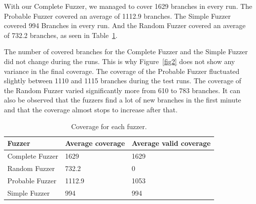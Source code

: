 \documentclass[runningheads]{llncs}
\begin{document}
With our Complete Fuzzer, we managed to cover 1629 branches in every run. The Probable Fuzzer covered an average of 1112.9 branches. The Simple Fuzzer covered 994 Branches in every run. And the Random Fuzzer covered an average of 732.2 branches, as seen in Table~\ref{tab3}.

The number of covered branches for the Complete Fuzzer and the Simple Fuzzer did not change during the runs. This is why Figure~\ref{fig2} does not show any variance in the final coverage. The coverage of the Probable Fuzzer fluctuated slightly between 1110 and 1115 branches during the test runs. The coverage of the Random Fuzzer varied significantly more from 610 to 783 branches.
It can also be observed that the fuzzers find a lot of new branches in the first minute and that the coverage almost stops to increase after that.

\bgroup
\def\arraystretch{1.5}
\setlength\tabcolsep{1.5ex}
\begin{table}[]
    \caption{Coverage for each fuzzer.}
    \label{tab3}
    \begin{center}
        \begin{tabular}{|l|l|l|}
            \hline
            \textbf{Fuzzer} & \textbf{Average coverage} & \textbf{Average valid coverage} \\ \hline \hline
            Complete Fuzzer & 1629                      & 1629                            \\ \hline
            Random Fuzzer   & 732.2                     & 0                               \\ \hline
            Probable Fuzzer & 1112.9                    & 1053                            \\ \hline
            Simple Fuzzer   & 994                       & 994                             \\ \hline
        
        \end{tabular}
    \end{center}
\end{table}
\egroup
\end{document}
